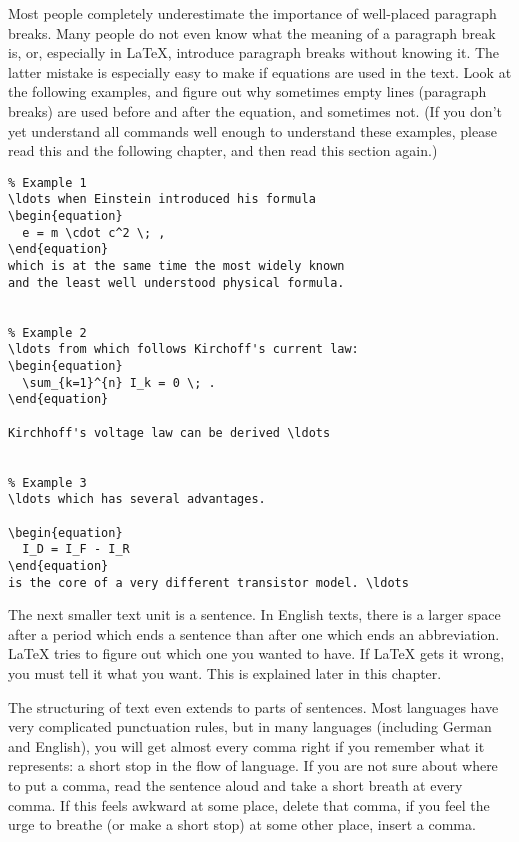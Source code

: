 Most people completely underestimate the importance of well-placed
paragraph breaks.  Many people do not even know what the meaning of
a paragraph break is, or, especially in \LaTeX, introduce paragraph
breaks without knowing it.  The latter mistake is especially easy to
make if equations are used in the text.  Look at the following
examples, and figure out why sometimes empty lines (paragraph breaks)
are used before and after the equation, and sometimes not.  (If you
don't yet understand all commands well enough to understand these
examples, please read this and the following chapter, and then read
this section again.)

\begin{code}
\begin{verbatim}
% Example 1
\ldots when Einstein introduced his formula 
\begin{equation} 
  e = m \cdot c^2 \; , 
\end{equation} 
which is at the same time the most widely known 
and the least well understood physical formula. 


% Example 2
\ldots from which follows Kirchoff's current law:
\begin{equation} 
  \sum_{k=1}^{n} I_k = 0 \; .
\end{equation} 

Kirchhoff's voltage law can be derived \ldots


% Example 3
\ldots which has several advantages.

\begin{equation} 
  I_D = I_F - I_R
\end{equation} 
is the core of a very different transistor model. \ldots
\end{verbatim}
\end{code} 

The next smaller text unit is a sentence.  In English texts, there is
a larger space after a period which ends a sentence than after one
which ends an abbreviation.  \LaTeX{} tries to figure out which one
you wanted to have.  If \LaTeX{} gets it wrong, you must tell it what
you want.  This is explained later in this chapter.

The structuring of text even extends to parts of sentences.  Most
languages have very complicated punctuation rules, but in many
languages (including German and English), you will get almost every
comma right if you remember what it represents: a short stop in the
flow of language.  If you are not sure about where to put a comma,
read the sentence aloud and take a short breath at every comma.  If
this feels awkward at some place, delete that comma, if you feel the
urge to breathe (or make a short stop) at some other place, insert a
comma.


